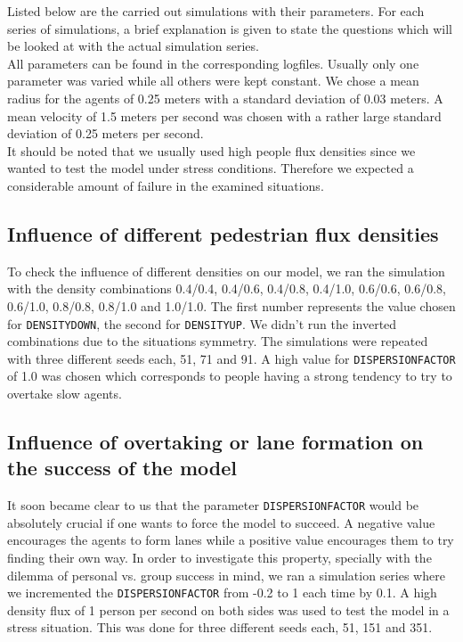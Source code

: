 
\noi Listed below are the carried out simulations with their parameters. For each series of simulations, a brief explanation is given to state the questions which will be looked at with the actual simulation series.\\
All parameters can be found in the corresponding logfiles. Usually only one parameter was varied while all others were kept constant. We chose a mean radius for the agents of 0.25 meters with a standard deviation of 0.03 meters. A mean velocity of 1.5 meters per second was chosen with a rather large standard deviation of 0.25 meters per second.\\
It should be noted that we usually used high people flux densities since we wanted to test the model under stress conditions. Therefore we expected a considerable amount of failure in the examined situations.

\subsection{Influence of different pedestrian flux densities}
To check the influence of different densities on our model, we ran the simulation with the density combinations 0.4/0.4, 0.4/0.6, 0.4/0.8, 0.4/1.0, 0.6/0.6, 0.6/0.8, 0.6/1.0, 0.8/0.8, 0.8/1.0 and 1.0/1.0. The first number represents the value chosen for \texttt{DENSITYDOWN}, the second for \texttt{DENSITYUP}. We didn't run the inverted combinations due to the situations symmetry. The simulations were repeated with three different seeds each, 51, 71 and 91. A high value for \texttt{DISPERSIONFACTOR} of 1.0 was chosen which corresponds to people having a strong tendency to try to overtake slow agents.

\subsection{Influence of overtaking or lane formation on the success of the model}
It soon became clear to us that the parameter \texttt{DISPERSIONFACTOR} would be absolutely crucial if one wants to force the model to succeed. A negative value encourages the agents to form lanes while a positive value encourages them to try finding their own way. In order to investigate this property, specially with the dilemma of personal vs. group success in mind, we ran a simulation series where we incremented the \texttt{DISPERSIONFACTOR} from -0.2 to 1 each time by 0.1. A high density flux of 1 person per second on both sides was used to test the model in a stress situation. This was done for three different seeds each, 51, 151 and 351. 

